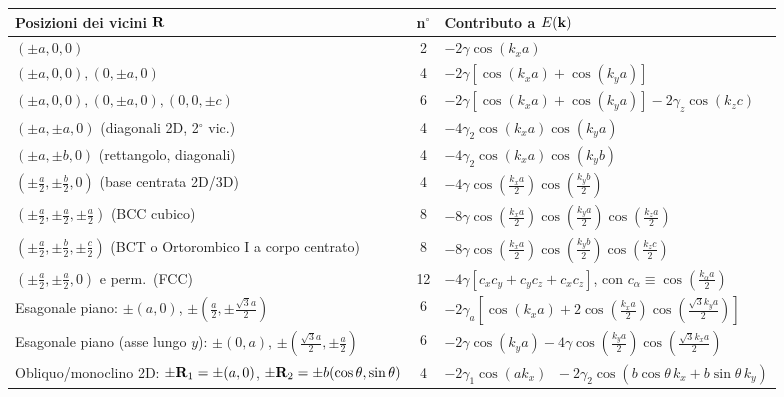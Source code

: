 \begin{center}
\renewcommand{\arraystretch}{1.7}
{\small
\begin{tabular}{p{6.2cm} c p{8.4cm}}
\toprule
\textbf{Posizioni dei vicini $\mathbf{R}$} & \textbf{n$^\circ$} & \textbf{Contributo a $E(\mathbf{k})$} \\
\midrule
$(\pm a,0,0)$ & 2 & $-2\gamma\cos(k_x a)$ \\
$(\pm a,0,0),(0,\pm a,0)$ & 4 & $-2\gamma\left[\cos(k_xa)+\cos(k_ya)\right]$ \\
$(\pm a,0,0),(0,\pm a,0),(0,0,\pm c)$ & 6 & $-2\gamma\left[\cos(k_xa)+\cos(k_ya)\right]-2\gamma_z\cos(k_zc)$ \\
$(\pm a,\pm a,0)$ (diagonali 2D, 2$^\circ$ vic.) & 4 & $-4\gamma_2\cos(k_xa)\cos(k_ya)$ \\
$(\pm a,\pm b,0)$ (rettangolo, diagonali) & 4 & $-4\gamma_2\cos(k_xa)\cos(k_yb)$ \\
$\left(\pm\frac a2,\pm\frac b2,0\right)$ (base centrata 2D/3D) & 4 & $-4\gamma\cos\!\left(\frac{k_xa}{2}\right)\cos\!\left(\frac{k_yb}{2}\right)$ \\
$\left(\pm\frac a2,\pm\frac a2,\pm\frac a2\right)$ (BCC cubico) & 8 & $-8\gamma\cos\!\left(\frac{k_xa}{2}\right)\cos\!\left(\frac{k_ya}{2}\right)\cos\!\left(\frac{k_za}{2}\right)$ \\
$\left(\pm\frac a2,\pm\frac b2,\pm\frac c2\right)$ \newline (BCT o Ortorombico I a corpo centrato) & 8 & $-8\gamma\cos\!\left(\frac{k_xa}{2}\right)\cos\!\left(\frac{k_yb}{2}\right)\cos\!\left(\frac{k_zc}{2}\right)$ \\
$\left(\pm\frac a2,\pm\frac a2,0\right)$ e perm.\ (FCC) & 12 & $-4\gamma\left[c_xc_y+c_yc_z+c_xc_z\right]$, \newline con $c_\alpha\equiv\cos\!\left(\frac{k_\alpha a}{2}\right)$ \\
Esagonale piano: \newline $\pm(a,0)$, $\pm\left(\frac a2,\pm\frac{\sqrt3 a}{2}\right)$ & 6 & $-2\gamma_a\left[\cos(k_xa)+2\cos\!\left(\frac{k_xa}{2}\right)\cos\!\left(\frac{\sqrt3 k_ya}{2}\right)\right]$ \\
Esagonale piano (asse lungo $y$): \newline $\pm(0,a)$, $\pm\left(\frac{\sqrt3a}{2},\pm\frac a2\right)$ & 6 & $-2\gamma\cos(k_ya)-4\gamma\cos\!\left(\frac{k_ya}{2}\right)\cos\!\left(\frac{\sqrt3k_xa}{2}\right)$ \\
Obliquo/monoclino 2D: \newline $\pm\mathbf{R}_1=\pm(a,0)$, \newline $\pm\mathbf{R}_2=\pm b(\cos\theta,\sin\theta)$ & 4 & $-2\gamma_1\cos(ak_x)$ \newline $\;-2\gamma_2\cos\!\left(b\cos\theta\,k_x + b\sin\theta\,k_y\right)$ \\

\end{tabular}}
\end{center}
